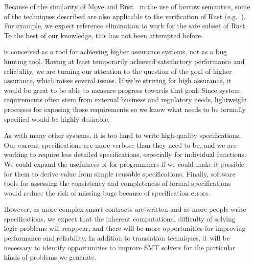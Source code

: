 Because of the similarity of Move and Rust~\cite{rust} in the use of borrow
semantics, some of the techniques described are also applicable to the
verification of Rust (e.g.~\cite{prusti,smack,nopanic,crust}).  For example, we
expect reference elimination to work for the safe subset of Rust.  To
the best of our knowledge, this has not been attempted before.



\MVP is conceived as a tool for achieving higher assurance systems, not as a bug
hunting tool. Having at least temporarily achieved satsifactory performance and
reliability, we are turning our attention to the question of the goal of higher
assurance, which raises several issues.  If we're striving for high assurance,
it would be great to be able to measure progress towards that goal.  Since
system requirements often stem from external business and regulatory needs,
lightweight processes for exposing those requirements so we know what needs to
be formally specified would be highly desirable.

As with many other systems, it is too hard to write high-quality specifications.
Our current specifications are more verbose than they need to be, and we are
working to require less detailed specifications, especially for individual
functions.  We could expand the usefulness of \MVP for programmers if we could
make it possible for them to derive value from simple reusable specifications.
Finally, software tools for assessing the consistency and completeness of formal
specifications would reduce the risk of missing bugs because of specification
errors.

However, as more complex smart contracts are written and as more people write
specifications, we expect that the inherent computational difficulty of solving
logic problems will reappear, and there will be more opportunities for improving
performance and reliability.  In addition to translation techniques, it will be
necessary to identify opportunities to improve SMT solvers for the particular
kinds of problems we generate.


